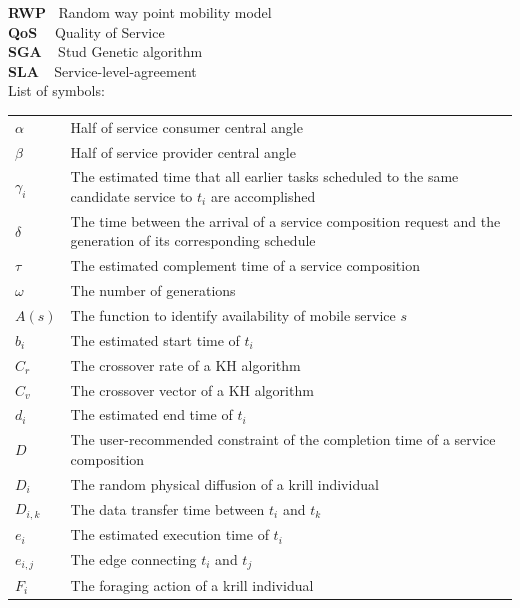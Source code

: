 \documentclass[journal]{IEEEtran}
\begin{document}
\noindent \textbf{RWP}   $\ $   Random way point mobility model \\
\noindent \textbf{QoS}   $\ \ \, $   Quality of Service \\
\noindent \textbf{SGA}   $\ \; $   Stud Genetic algorithm \\
\noindent \textbf{SLA}   $\ \ $   Service-level-agreement \\

\noindent List of symbols: 
~\\

\noindent
\begin{tabular}{@{} l p{7.36cm} }
$\alpha$      &   Half of service consumer central angle \\
$\beta$       &   Half of service provider central angle \\
$\gamma_{i}$  &   The estimated time that all earlier tasks scheduled to the same candidate service to $t_i$ are accomplished  \\
$\delta$      &   The time between the arrival of a service composition request and the generation of its corresponding schedule \\
$\tau$        &   The estimated complement time of a service composition \\
$\omega$      &   The number of generations \\
$A(s)$        &   The function to identify availability of mobile service $s$ \\
$b_i$         &   The estimated start time of $t_i$ \\
$C_{r}$       &   The crossover rate of a KH algorithm \\
$C_{v}$       &   The crossover vector of a KH algorithm \\
$d_i$         &   The estimated end time of $t_i$ \\
$D$           &   The user-recommended constraint of the completion time of a service composition \\
$D_i$         &   The random physical diffusion of a krill individual \\
$D_{i,k}$     &   The data transfer time between $t_i$ and $t_k$ \\
$e_i$         &   The estimated execution time of $t_i$ \\
$e_{i,j}$     &   The edge connecting $t_i$ and $t_j$ \\
$F_i$         &   The foraging action of a krill individual \\ 

\end{tabular}
\end{document}

